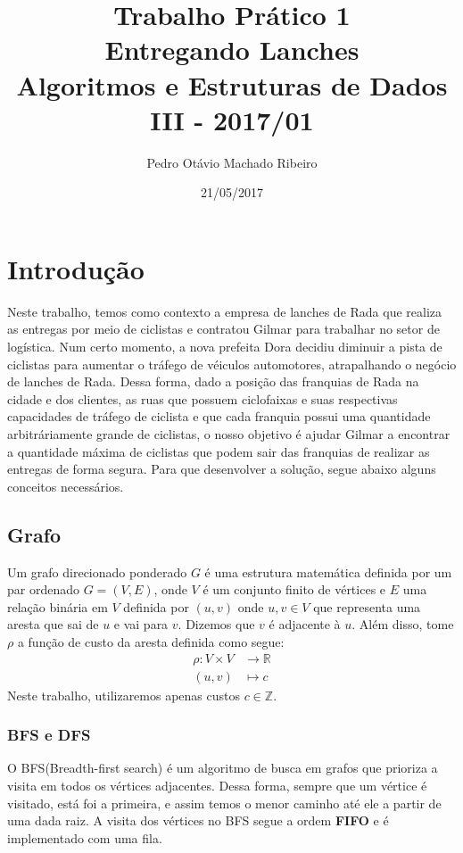 \documentclass[
	12pt,
	a4paper,
	twoside,
	brazil
]{article}
\author{Pedro Otávio Machado Ribeiro}
\title{Trabalho Prático 1\\Entregando Lanches\\Algoritmos e Estruturas de Dados III - 2017/01}
\date{21/05/2017}
\theoremstyle{definition}
\begin{document}
	\maketitle
	
	\section{Introdução}
	
	Neste trabalho, temos como contexto a empresa de lanches de Rada que realiza as entregas por meio de ciclistas e contratou Gilmar para trabalhar no setor de logística. Num certo momento, a nova prefeita Dora decidiu diminuir a pista de ciclistas para aumentar o tráfego de véiculos automotores, atrapalhando o negócio de lanches de Rada. Dessa forma, dado a posição das franquias de Rada na cidade e dos clientes, as ruas que possuem ciclofaixas e suas respectivas capacidades de tráfego de ciclista e que cada franquia possui uma quantidade arbitráriamente grande de ciclistas, o nosso objetivo é ajudar Gilmar a encontrar a quantidade máxima de ciclistas que podem sair das franquias de realizar as entregas de forma segura. Para que desenvolver a solução, segue abaixo alguns conceitos necessários.
	
	\subsection{Grafo}
	
	Um grafo direcionado ponderado $G$ é uma estrutura matemática definida por um par ordenado $G = (V,E)$, onde $V$ é um conjunto finito de vértices e $E$ uma relação binária em $V$ definida por $(u,v)$ onde $u,v \in V$ que representa uma aresta que sai de $u$ e vai para $v$. Dizemos que $v$ é adjacente à $u$. Além disso, tome $\rho$ a função de custo da aresta definida como segue:
	\begin{align*}
	\rho \colon  V\times V &\to \mathbb{R} \\
	(u,v) &\mapsto c
	\end{align*}
	Neste trabalho, utilizaremos apenas custos $c \in \mathbb{Z}$.
	
	\subsubsection{BFS e DFS}
	
	O BFS(Breadth-first search) é um algoritmo de busca em grafos que prioriza a visita em todos os vértices adjacentes. Dessa forma, sempre que um vértice é visitado, está foi a primeira, e assim temos o menor caminho até ele a partir de uma dada raiz. A visita dos vértices no BFS segue a ordem \textbf{FIFO} e é implementado com uma fila.
	
\end{document}
